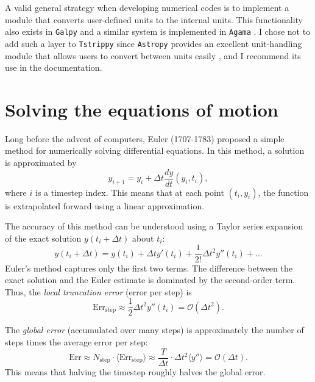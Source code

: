     A valid general strategy when developing numerical codes is to implement a module that converts user-defined units to the internal units. This functionality also exists in \texttt{Galpy} and a similar system is implemented in \texttt{Agama} \citep{2018arXiv180208255V}. I chose not to add such a layer to \texttt{Tstrippy} since \texttt{Astropy} provides an excellent unit-handling module that allows users to convert between units easily \citep{2013A&A...558A..33A}, and I recommend its use in the documentation. 

\section{Solving the equations of motion}
    Long before the advent of computers, Euler (1707-1783) proposed a simple method for numerically solving differential equations. In this method, a solution is approximated by
    \begin{equation}
        y_{i+1} = y_i + \Delta t \frac{dy}{dt}\left(y_i,t_i\right),
    \end{equation}
    where \( i \) is a timestep index. This means that at each point \( (t_i, y_i) \), the function is extrapolated forward using a linear approximation.

    The accuracy of this method can be understood using a Taylor series expansion of the exact solution \( y(t_i + \Delta t) \) about \( t_i \):
    \begin{equation}
        y(t_i + \Delta t) = y(t_i) + \Delta t y'(t_i) + \frac{1}{2!}\Delta t^2 y''(t_i) + \dots
    \end{equation}
    Euler's method captures only the first two terms. The difference between the exact solution and the Euler estimate is dominated by the second-order term. Thus, the \textit{local truncation error} (error per step) is
    \[
    \mathrm{Err}_{\mathrm{step}} \approx \frac{1}{2} \Delta t^2 y''(t_i) = \mathcal{O}(\Delta t^2).
    \]

    The \textit{global error} (accumulated over many steps) is approximately the number of steps times the average error per step:
    \[
    \mathrm{Err} \approx N_{\mathrm{step}} \cdot \langle \mathrm{Err}_{\mathrm{step}} \rangle \approx \frac{T}{\Delta t} \cdot \Delta t^2 \langle y'' \rangle = \mathcal{O}(\Delta t).
    \]
    This means that halving the timestep roughly halves the global error.


